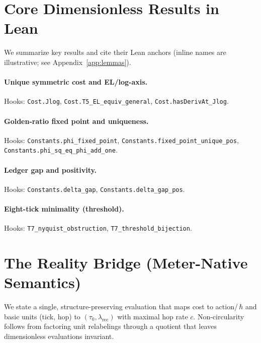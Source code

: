 \documentclass[11pt]{article}
\newcommand{\LeanHook}[1]{\texttt{#1}}
\begin{document}
\section{Core Dimensionless Results in Lean}
We summarize key results and cite their Lean anchors (inline names are illustrative; see Appendix~\ref{app:lemmas}).

\paragraph{Unique symmetric cost and EL/log-axis.} Hooks: \LeanHook{Cost.Jlog}, \LeanHook{Cost.T5\_EL\_equiv\_general}, \LeanHook{Cost.hasDerivAt\_Jlog}.

\paragraph{Golden-ratio fixed point and uniqueness.} Hooks: \LeanHook{Constants.phi\_fixed\_point}, \LeanHook{Constants.fixed\_point\_unique\_pos}, \LeanHook{Constants.phi\_sq\_eq\_phi\_add\_one}.

\paragraph{Ledger gap and positivity.} Hooks: \LeanHook{Constants.delta\_gap}, \LeanHook{Constants.delta\_gap\_pos}.

\paragraph{Eight-tick minimality (threshold).} Hooks: \LeanHook{T7\_nyquist\_obstruction}, \LeanHook{T7\_threshold\_bijection}.

\section{The Reality Bridge (Meter-Native Semantics)}
We state a single, structure-preserving evaluation that maps cost to action/\,$\hbar$ and basic units (tick, hop) to $(\tau_0,\lambda_{\mathrm{rec}})$ with maximal hop rate $c$. Non-circularity follows from factoring unit relabelings through a quotient that leaves dimensionless evaluations invariant.
\end{document}
